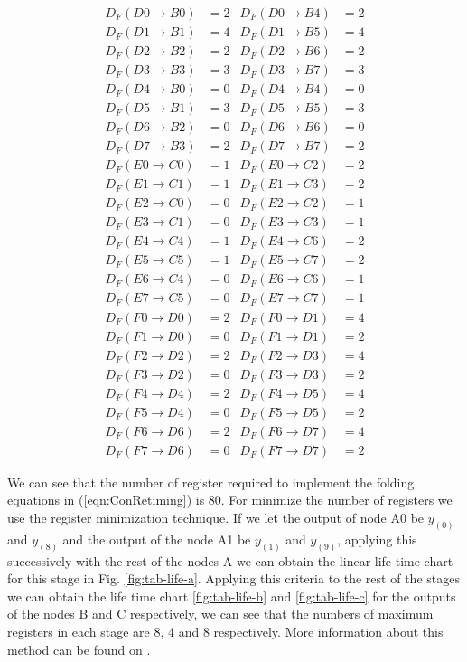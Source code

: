 \documentclass[journal,comsoc]{IEEEtran}
\begin{document}
\begin{small}
\begin{align}\label{eqn:ConRetiming} 
D_F(D0\to B0)&=2 &  D_F(D0\to B4)&=2 		 \\
D_F(D1\to B1)&=4 &  D_F(D1\to B5)&=4\nonumber\\
D_F(D2\to B2)&=2 &  D_F(D2\to B6)&=2\nonumber\\
D_F(D3\to B3)&=3 &  D_F(D3\to B7)&=3\nonumber\\
D_F(D4\to B0)&=0 &  D_F(D4\to B4)&=0\nonumber\\
D_F(D5\to B1)&=3 &  D_F(D5\to B5)&=3\nonumber\\
D_F(D6\to B2)&=0 &  D_F(D6\to B6)&=0\nonumber\\
D_F(D7\to B3)&=2 &  D_F(D7\to B7)&=2\nonumber\\
D_F(E0\to C0)&=1 &  D_F(E0\to C2)&=2\nonumber\\
D_F(E1\to C1)&=1 &  D_F(E1\to C3)&=2\nonumber\\
D_F(E2\to C0)&=0 &  D_F(E2\to C2)&=1\nonumber\\
D_F(E3\to C1)&=0 &  D_F(E3\to C3)&=1\nonumber\\
D_F(E4\to C4)&=1 &  D_F(E4\to C6)&=2\nonumber\\
D_F(E5\to C5)&=1 &  D_F(E5\to C7)&=2\nonumber\\
D_F(E6\to C4)&=0 &  D_F(E6\to C6)&=1\nonumber\\
D_F(E7\to C5)&=0 &  D_F(E7\to C7)&=1\nonumber\\
D_F(F0\to D0)&=2 &  D_F(F0\to D1)&=4\nonumber\\
D_F(F1\to D0)&=0 &  D_F(F1\to D1)&=2\nonumber\\
D_F(F2\to D2)&=2 &  D_F(F2\to D3)&=4\nonumber\\
D_F(F3\to D2)&=0 &  D_F(F3\to D3)&=2\nonumber\\
D_F(F4\to D4)&=2 &  D_F(F4\to D5)&=4\nonumber\\
D_F(F5\to D4)&=0 &  D_F(F5\to D5)&=2\nonumber\\
D_F(F6\to D6)&=2 &  D_F(F6\to D7)&=4\nonumber\\
D_F(F7\to D6)&=0 &  D_F(F7\to D7)&=2\nonumber
\end{align}
\end{small}
We can see that the number of register required to implement the folding equations in (\ref{eqn:ConRetiming}) is 80. For minimize the number of registers we use the register minimization technique. 
If we let the output of node A0 be $y_{(0)}$ and $y_{(8)}$ and the output of the node A1 be $y_{(1)}$ and $y_{(9)}$, applying this successively with the rest of the nodes A we can obtain the linear life time chart for this stage in Fig. \ref{fig:tab-life-a}. Applying this criteria to the rest of the stages we can obtain the life time chart \ref{fig:tab-life-b} and \ref{fig:tab-life-c} for the outputs of the nodes B and C respectively, we can see that the numbers of maximum registers in each stage are 8, 4 and 8 respectively. More information about this method can be found on \cite{pipeline_parhi_book}.
\end{document}
